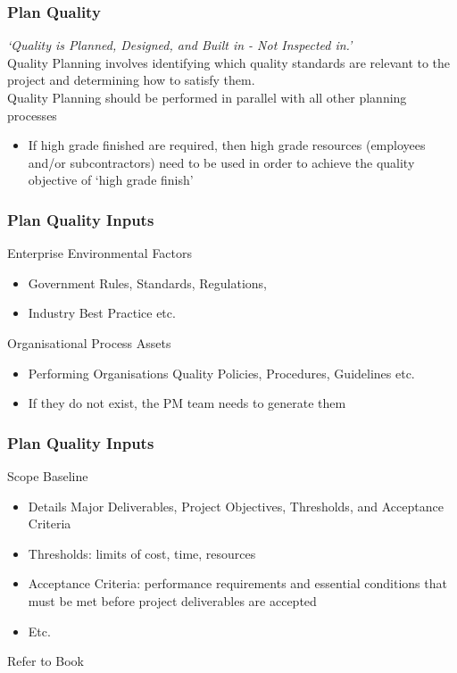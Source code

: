 \begin{frame}
\frametitle{Plan Quality}
\textit{`Quality is Planned, Designed, and Built in - Not Inspected in.'}\\
Quality Planning involves identifying which quality standards are relevant to the project and determining how to satisfy them.\\
Quality Planning should be performed in parallel with all other planning processes\\
\begin{itemize}
	\item If high grade finished are required, then high grade resources (employees and/or subcontractors) need to be used in order to achieve the quality objective of `high grade finish'
\end{itemize}
\end{frame}




\begin{frame}
\frametitle{Plan Quality \hfill Inputs}
Enterprise Environmental Factors\\
\begin{itemize}
	\item Government Rules, Standards, Regulations,
	\item Industry Best Practice etc.
\end{itemize}
Organisational Process Assets\\
\begin{itemize}
	\item Performing Organisations Quality Policies, Procedures, Guidelines etc.
	\item If they do not exist, the PM team needs to generate them
\end{itemize}
\end{frame}




\begin{frame}
\frametitle{Plan Quality \hfill Inputs}
Scope Baseline\\
\begin{itemize}
	\item Details Major Deliverables, Project Objectives, Thresholds, and Acceptance Criteria
	\item Thresholds: limits of cost, time, resources
	\item Acceptance Criteria: performance requirements and essential conditions that must be met before project deliverables are accepted
	\item Etc.
\end{itemize}
Refer to Book
\end{frame}




